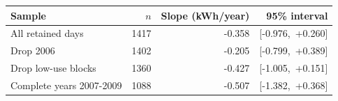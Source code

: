 \begin{tabular}{@{}lrrr@{}}
\toprule
Sample & $n$ & Slope (kWh/year) & 95\% interval \\
\midrule
All retained days & 1417 & -0.358 & [-0.976,\ +0.260] \\
Drop 2006 & 1402 & -0.205 & [-0.799,\ +0.389] \\
Drop low-use blocks & 1360 & -0.427 & [-1.005,\ +0.151] \\
Complete years 2007-2009 & 1088 & -0.507 & [-1.382,\ +0.368] \\
\bottomrule
\end{tabular}
